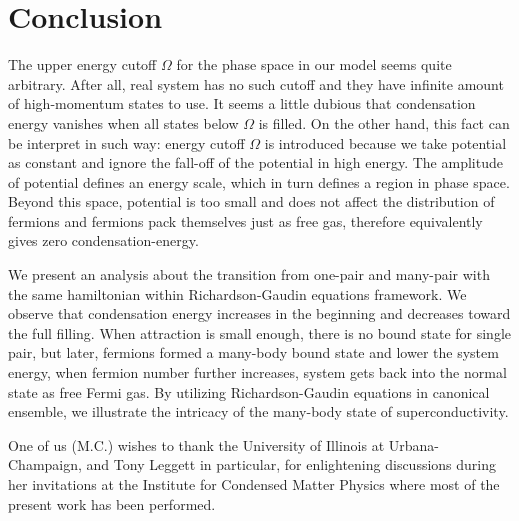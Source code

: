 \documentclass{article}
\begin{document}
\section{Conclusion\label{sec:conclusion}}
The upper energy cutoff $\Omega$ for the phase space in our model seems quite arbitrary.  After all, real system has no such cutoff and they have infinite amount of high-momentum states to use.   It seems a little dubious that condensation energy vanishes when all states below $\Omega$ is filled.  On the other hand, this fact can be interpret in such way:  energy cutoff $\Omega$ is introduced because we take potential as constant and ignore the fall-off of the potential in high energy.  The amplitude of potential defines an energy scale, which in turn defines a region in phase space.  Beyond this space, potential is too small and does not affect the distribution of fermions and fermions pack themselves just as free gas, therefore equivalently gives zero condensation-energy. 

We present an analysis about the transition from one-pair and many-pair with the same hamiltonian within Richardson-Gaudin equations framework.  We observe that condensation energy increases in the beginning and decreases toward the full filling. When attraction is small enough, there is no bound state for single pair, but later, fermions formed a many-body bound state and lower the system energy, when fermion number further increases, system gets back into the normal state as free Fermi gas.  By utilizing Richardson-Gaudin equations in canonical ensemble, we illustrate the intricacy of the many-body state of superconductivity.  

One of us (M.C.) wishes to thank the University of Illinois at
Urbana-Champaign, and Tony Leggett in particular, for enlightening discussions during her invitations at
the Institute for Condensed Matter Physics where most of the present work has been
performed. 

%


\end{document}

